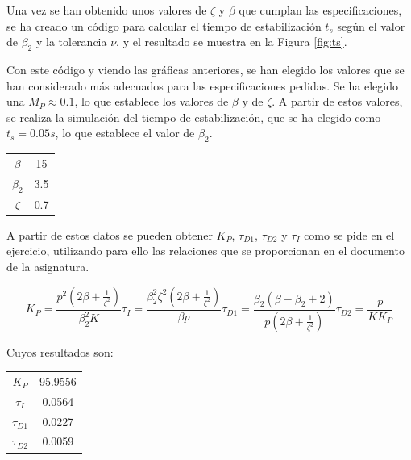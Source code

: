 \documentclass[a4paper]{article}
\begin{document}
Una vez se han obtenido unos valores de $\zeta$ y $\beta$ que cumplan las especificaciones, se ha creado un código para calcular el tiempo de estabilización $t_s$ según el valor de $\beta_2$ y la tolerancia $\nu$, y el resultado se muestra en la Figura \ref{fig:ts}.

Con este código y viendo las gráficas anteriores, se han elegido los valores que se han considerado más adecuados para las especificaciones pedidas. Se ha elegido una $M_P \approx 0.1$, lo que establece los valores de $\beta$ y de $\zeta$. A partir de estos valores, se realiza la simulación del tiempo de estabilización, que se ha elegido como $t_s = 0.05 s$, lo que establece el valor de $\beta_2$.

\begin{center}
	\begin{tabular}{c|c}
			$\beta$ & 15 \\
			$\beta_2$ & 3.5 \\
			$\zeta$ & 0.7 \\
	\end{tabular}
\end{center}

A partir de estos datos se pueden obtener $K_P$, $\tau_{D1}$, $\tau_{D2}$ y $\tau_I$ como se pide en el ejercicio, utilizando para ello las relaciones que se proporcionan en el documento de la asignatura.

\begin{subequations}
	\begin{equation}
		K_P=\frac{p^2(2\beta+\frac{1}{\zeta^2})}{\beta_2^2 K}
	\end{equation}
	\begin{equation}
		\tau_I=\frac{\beta_2^2\zeta^2(2\beta + \frac{1}{\zeta^2})}{\beta p}
	\end{equation}
	\begin{equation}
		\tau_{D1}=\frac{\beta_2(\beta-\beta_2+2)}{p(2\beta + \frac{1}{\zeta^2})}
	\end{equation}
	\begin{equation}
		\tau_{D2}=\frac{p}{K K_P}
	\end{equation}
\end{subequations}

Cuyos resultados son:
\begin{center}
	\begin{tabular}{c|c}
		$K_P$ & 95.9556 \\
		$\tau_I$ & 0.0564 \\
		$\tau_{D1}$ & 0.0227 \\
		$\tau_{D2}$ & 0.0059 \\
	\end{tabular}
\end{center}
\end{document}
